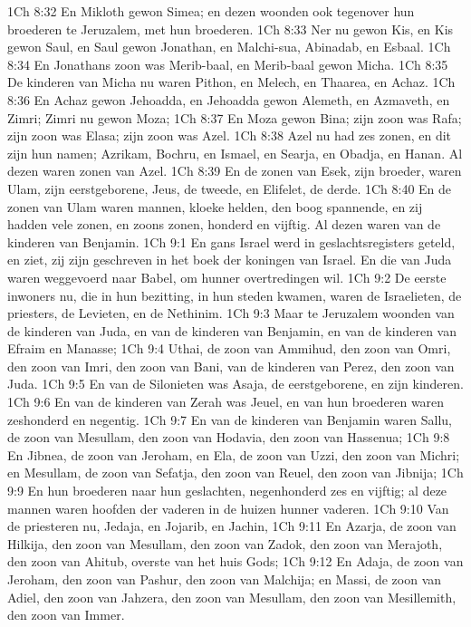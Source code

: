 1Ch 8:32  En Mikloth gewon Simea; en dezen woonden ook tegenover hun broederen te Jeruzalem, met hun broederen.
1Ch 8:33  Ner nu gewon Kis, en Kis gewon Saul, en Saul gewon Jonathan, en Malchi-sua, Abinadab, en Esbaal.
1Ch 8:34  En Jonathans zoon was Merib-baal, en Merib-baal gewon Micha.
1Ch 8:35  De kinderen van Micha nu waren Pithon, en Melech, en Thaarea, en Achaz.
1Ch 8:36  En Achaz gewon Jehoadda, en Jehoadda gewon Alemeth, en Azmaveth, en Zimri; Zimri nu gewon Moza;
1Ch 8:37  En Moza gewon Bina; zijn zoon was Rafa; zijn zoon was Elasa; zijn zoon was Azel.
1Ch 8:38  Azel nu had zes zonen, en dit zijn hun namen; Azrikam, Bochru, en Ismael, en Searja, en Obadja, en Hanan. Al dezen waren zonen van Azel.
1Ch 8:39  En de zonen van Esek, zijn broeder, waren Ulam, zijn eerstgeborene, Jeus, de tweede, en Elifelet, de derde.
1Ch 8:40  En de zonen van Ulam waren mannen, kloeke helden, den boog spannende, en zij hadden vele zonen, en zoons zonen, honderd en vijftig. Al dezen waren van de kinderen van Benjamin.
1Ch 9:1  En gans Israel werd in geslachtsregisters geteld, en ziet, zij zijn geschreven in het boek der koningen van Israel. En die van Juda waren weggevoerd naar Babel, om hunner overtredingen wil.
1Ch 9:2  De eerste inwoners nu, die in hun bezitting, in hun steden kwamen, waren de Israelieten, de priesters, de Levieten, en de Nethinim.
1Ch 9:3  Maar te Jeruzalem woonden van de kinderen van Juda, en van de kinderen van Benjamin, en van de kinderen van Efraim en Manasse;
1Ch 9:4  Uthai, de zoon van Ammihud, den zoon van Omri, den zoon van Imri, den zoon van Bani, van de kinderen van Perez, den zoon van Juda.
1Ch 9:5  En van de Silonieten was Asaja, de eerstgeborene, en zijn kinderen.
1Ch 9:6  En van de kinderen van Zerah was Jeuel, en van hun broederen waren zeshonderd en negentig.
1Ch 9:7  En van de kinderen van Benjamin waren Sallu, de zoon van Mesullam, den zoon van Hodavia, den zoon van Hassenua;
1Ch 9:8  En Jibnea, de zoon van Jeroham, en Ela, de zoon van Uzzi, den zoon van Michri; en Mesullam, de zoon van Sefatja, den zoon van Reuel, den zoon van Jibnija;
1Ch 9:9  En hun broederen naar hun geslachten, negenhonderd zes en vijftig; al deze mannen waren hoofden der vaderen in de huizen hunner vaderen.
1Ch 9:10  Van de priesteren nu, Jedaja, en Jojarib, en Jachin,
1Ch 9:11  En Azarja, de zoon van Hilkija, den zoon van Mesullam, den zoon van Zadok, den zoon van Merajoth, den zoon van Ahitub, overste van het huis Gods;
1Ch 9:12  En Adaja, de zoon van Jeroham, den zoon van Pashur, den zoon van Malchija; en Massi, de zoon van Adiel, den zoon van Jahzera, den zoon van Mesullam, den zoon van Mesillemith, den zoon van Immer.
